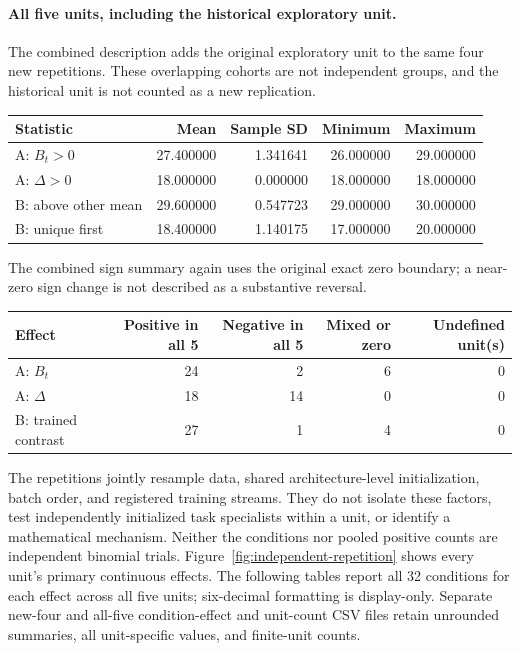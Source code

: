 \paragraph{All five units, including the historical exploratory unit.}
The combined description adds the original exploratory unit to the same four new repetitions. These overlapping cohorts are not independent groups, and the historical unit is not counted as a new replication.
\begin{center}\small\begin{tabular}{lrrrr}\toprule
Statistic & Mean & Sample SD & Minimum & Maximum\\\midrule
A: $B_t>0$ & 27.400000 & 1.341641 & 26.000000 & 29.000000\\
A: $\Delta>0$ & 18.000000 & 0.000000 & 18.000000 & 18.000000\\
B: above other mean & 29.600000 & 0.547723 & 29.000000 & 30.000000\\
B: unique first & 18.400000 & 1.140175 & 17.000000 & 20.000000\\
\bottomrule\end{tabular}\end{center}
The combined sign summary again uses the original exact zero boundary; a near-zero sign change is not described as a substantive reversal.
\begin{center}\small\begin{tabular}{lrrrr}\toprule
Effect & Positive in all 5 & Negative in all 5 & Mixed or zero & Undefined unit(s)\\\midrule
A: $B_t$ & 24 & 2 & 6 & 0\\
A: $\Delta$ & 18 & 14 & 0 & 0\\
B: trained contrast & 27 & 1 & 4 & 0\\
\bottomrule\end{tabular}\end{center}
The repetitions jointly resample data, shared architecture-level initialization, batch order, and registered training streams. They do not isolate these factors, test independently initialized task specialists within a unit, or identify a mathematical mechanism. Neither the conditions nor pooled positive counts are independent binomial trials.
Figure~\ref{fig:independent-repetition} shows every unit's primary continuous effects. The following tables report all 32 conditions for each effect across all five units; six-decimal formatting is display-only. Separate new-four and all-five condition-effect and unit-count CSV files retain unrounded summaries, all unit-specific values, and finite-unit counts.
